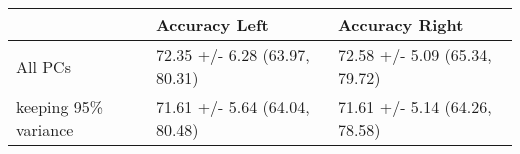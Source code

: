 \begin{tabular}{lll}
\toprule
{} &                  Accuracy Left &                 Accuracy Right \\
\midrule
All PCs              &  72.35 +/- 6.28 (63.97, 80.31) &  72.58 +/- 5.09 (65.34, 79.72) \\
keeping 95\% variance &  71.61 +/- 5.64 (64.04, 80.48) &  71.61 +/- 5.14 (64.26, 78.58) \\
\bottomrule
\end{tabular}
